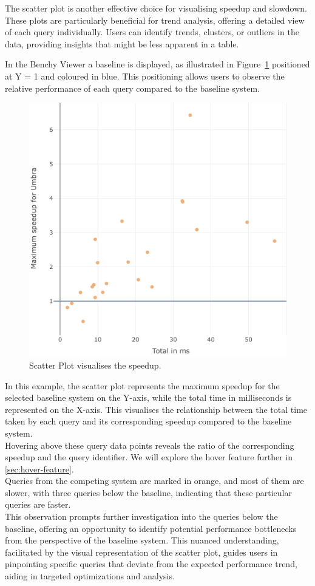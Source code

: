 The scatter plot is another effective choice for visualising speedup and slowdown. These plots are particularly beneficial for trend analysis, offering a detailed view of each query individually. Users can identify trends, clusters, or outliers in the data, providing insights that might be less apparent in a table.

In the Benchy Viewer a baseline is displayed, as illustrated in Figure~\ref{fig:scatter} positioned at Y = 1 and coloured in blue. This positioning allows users to observe the relative performance of each query compared to the baseline system.

\begin{figure}[h]
  \centering
  \includegraphics[width=0.7\linewidth]{figures/bsp-scatter.png}
  \caption{Scatter Plot visualises the speedup.}
  \label{fig:scatter}
\end{figure}

In this example, the scatter plot represents the maximum speedup for the selected baseline system on the Y-axis, while the total time in milliseconds is represented on the X-axis. This visualises the relationship between the total time taken by each query and its corresponding speedup compared to the baseline system.\\
Hovering above these query data points reveals the ratio of the corresponding speedup and the query identifier. We will explore the hover feature further in \ref{sec:hover-feature}.\\
Queries from the competing system are marked in orange, and most of them are slower, with three queries below the baseline, indicating that these particular queries are faster.\\
This observation prompts further investigation into the queries below the baseline, offering an opportunity to identify potential performance bottlenecks from the perspective of the baseline system. This nuanced understanding, facilitated by the visual representation of the scatter plot, guides users in pinpointing specific queries that deviate from the expected performance trend, aiding in targeted optimizations and analysis.


